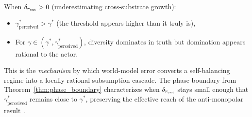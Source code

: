 When $\delta_{r_{\mathrm{ext}}} > 0$ (underestimating cross-substrate growth):
\begin{itemize}
\item $\gamma^*_{\mathrm{perceived}} > \gamma^*$ (the threshold
  appears higher than it truly is),
\item For $\gamma \in (\gamma^*, \gamma^*_{\mathrm{perceived}})$,
  diversity dominates in truth but domination appears rational to the
  actor.
\end{itemize}

This is the \emph{mechanism} by which world-model error converts a
self-balancing regime into a locally rational subsumption cascade.  The
phase boundary from Theorem~\ref{thm:phase_boundary} characterizes
when $\delta_{r_{\mathrm{ext}}}$ stays small enough that
$\gamma^*_{\mathrm{perceived}}$ remains close to $\gamma^*$,
preserving the effective reach of the anti-monopolar result~\citep{lasser2026horizon}.
